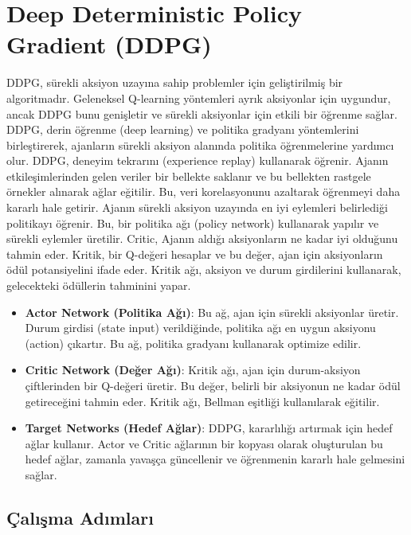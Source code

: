 \section{Deep Deterministic Policy Gradient (DDPG)}

DDPG, sürekli aksiyon uzayına sahip problemler için geliştirilmiş bir algoritmadır. Geleneksel Q-learning yöntemleri ayrık aksiyonlar için uygundur, ancak DDPG bunu genişletir ve sürekli aksiyonlar için etkili bir öğrenme sağlar. DDPG, derin öğrenme (deep learning) ve politika gradyanı yöntemlerini birleştirerek, ajanların sürekli aksiyon alanında politika öğrenmelerine yardımcı olur. DDPG, deneyim tekrarını (experience replay) kullanarak öğrenir. Ajanın etkileşimlerinden gelen veriler bir bellekte saklanır ve bu bellekten rastgele örnekler alınarak ağlar eğitilir. Bu, veri korelasyonunu azaltarak öğrenmeyi daha kararlı hale getirir. Ajanın sürekli aksiyon uzayında en iyi eylemleri belirlediği politikayı öğrenir. Bu, bir politika ağı (policy network) kullanarak yapılır ve sürekli eylemler üretilir. Critic, Ajanın aldığı aksiyonların ne kadar iyi olduğunu tahmin eder. Kritik, bir Q-değeri hesaplar ve bu değer, ajan için aksiyonların ödül potansiyelini ifade eder. Kritik ağı, aksiyon ve durum girdilerini kullanarak, gelecekteki ödüllerin tahminini yapar. 

\begin{itemize}
    \item \textbf{Actor Network (Politika Ağı)}: Bu ağ, ajan için sürekli aksiyonlar üretir. Durum girdisi (state input) verildiğinde, politika ağı en uygun aksiyonu (action) çıkartır. Bu ağ, politika gradyanı kullanarak optimize edilir.
    \item \textbf{Critic Network (Değer Ağı)}: Kritik ağı, ajan için durum-aksiyon çiftlerinden bir Q-değeri üretir. Bu değer, belirli bir aksiyonun ne kadar ödül getireceğini tahmin eder. Kritik ağı, Bellman eşitliği kullanılarak eğitilir.
    \item \textbf{Target Networks (Hedef Ağlar)}: DDPG, kararlılığı artırmak için hedef ağlar kullanır. Actor ve Critic ağlarının bir kopyası olarak oluşturulan bu hedef ağlar, zamanla yavaşça güncellenir ve öğrenmenin kararlı hale gelmesini sağlar.
\end{itemize}

\subsection{Çalışma Adımları}

